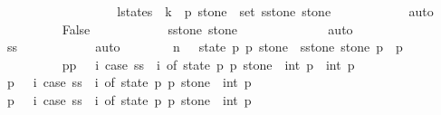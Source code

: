 \begin{isabellebody}
\ \ \ \ \ \ \ \ \isamarkupfalse%
\isanewline
\ \ \ \ \ \ \ \ \isamarkupfalse%
\ {\isachardoublequoteopen}{\isacharparenleft}l{\isacharunderscore}states\ {\isacharbang}\ k{\isacharcomma}\ {}{\isacharcomma}\ p{}{\isacharcomma}\ stone{\isacharparenright}\ {\isasymin}\ set\ {\isacharparenleft}{\isacharquery}sstone\ stone{\isacharparenright}{\isachardoublequoteclose}\isanewline
\ \ \ \ \ \ \ \ \ \ \isamarkupfalse%
\ auto\isanewline
\ \ \ \ \ \ \ \ \isamarkupfalse%
\ False\isanewline
\ \ \ \ \ \ \ \ \ \ \isamarkupfalse%
\ {\isacharbackquoteopen}{\isacharquery}sstone\ stone\ {\isacharequal}\ {\isacharbrackleft}{\isacharbrackright}{\isacharbackquoteclose}\isanewline
\ \ \ \ \ \ \ \ \ \ \isamarkupfalse%
\ auto\isanewline
\ \ \ \ \ \ \isamarkupfalse%
\isanewline
\ \ \ \ \ \ \isamarkupfalse%
\ {\isachardoublequoteopen}ss\ {\isasymnoteq}\ {\isacharbrackleft}{\isacharbrackright}{\isachardoublequoteclose}\isanewline
\ \ \ \ \ \ \ \ \isamarkupfalse%
\ auto\isanewline
\isanewline
\ \ \ \ \ \ \isamarkupfalse%
\ {\isachardoublequoteopen}n\ {\isacharequal}\ {\isacharparenleft}{\isasymSum}\ {\isacharparenleft}state{\isacharcomma}\ p{}{\isacharcomma}\ p{}{\isacharcomma}\ stone{\isacharparenright}\ {\isasymleftarrow}\ {\isacharquery}sstone\ stone{\isachardot}\ p{}\ {\isacharminus}\ p{}{\isacharparenright}{\isachardoublequoteclose}\isanewline
\ \ \ \ \ \ \isamarkupfalse%
{\isacharminus}\isanewline
\ \ \ \ \ \ \ \ \isamarkupfalse%
\ {\isacharquery}p{}p{}\ {\isacharequal}\ {\isachardoublequoteopen}{\isasymlambda}\ i{\isachardot}\ case\ ss\ {\isacharbang}\ i\ of\ {\isacharparenleft}state{\isacharcomma}\ p{}{\isacharcomma}\ p{}{\isacharcomma}\ stone{\isacharparenright}\ {\isasymRightarrow}\ int\ p{}\ {\isacharminus}\ int\ p{}{\isachardoublequoteclose}\isanewline
\ \ \ \ \ \ \ \ \isamarkupfalse%
\ {\isacharquery}p{}\ {\isacharequal}\ {\isachardoublequoteopen}{\isasymlambda}\ i{\isachardot}\ case\ ss\ {\isacharbang}\ i\ of\ {\isacharparenleft}state{\isacharcomma}\ p{}{\isacharcomma}\ p{}{\isacharcomma}\ stone{\isacharparenright}\ {\isasymRightarrow}\ int\ p{}{\isachardoublequoteclose}\isanewline
\ \ \ \ \ \ \ \ \isamarkupfalse%
\ {\isacharquery}p{}\ {\isacharequal}\ {\isachardoublequoteopen}{\isasymlambda}\ i{\isachardot}\ case\ ss\ {\isacharbang}\ i\ of\ {\isacharparenleft}state{\isacharcomma}\ p{}{\isacharcomma}\ p{}{\isacharcomma}\ stone{\isacharparenright}\ {\isasymRightarrow}\ int\ p{}{\isachardoublequoteclose}\isanewline

\end{isabellebody}
